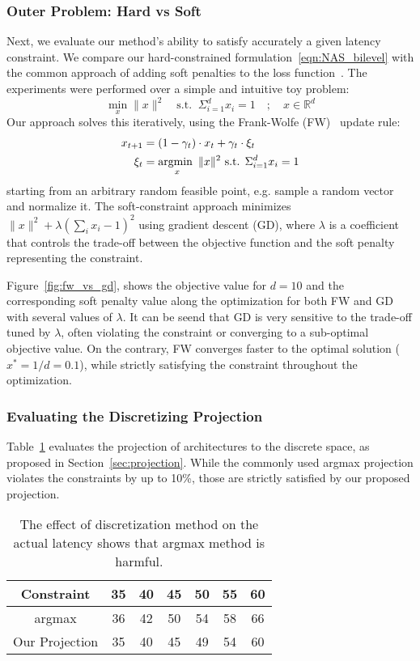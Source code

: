 \documentclass[dvipsnames,table,xcdraw]{article}
\newcommand{\argmin}{\operatornamewithlimits{argmin~}}
\begin{document}
\subsubsection{Outer Problem: Hard vs Soft }\label{subsec:toy_example}
Next, we evaluate our method's ability to satisfy accurately a given latency constraint.
We compare our hard-constrained formulation~\eqref{eqn:NAS_bilevel} with the common approach of adding soft penalties to the loss function~\cite{TF-NAS, fbnet}.
The experiments were performed over a simple and intuitive toy problem:
\begin{equation}
    \label{eqn:toy_ex}
    \min_x \|x\|^2  \quad \text{s.t. }\ 
       \Sigma_{i=1}^d x_i = 1 \quad ; \quad x\in\mathbb{R}^d
\end{equation}
Our approach solves this iteratively, using the Frank-Wolfe (FW)~\cite{frank_wolfe} update rule:
\begin{align}\label{eqn:toy_fw_step}
x_{t+1} &= (1-\gamma_t)\cdot x_t + \gamma_t\cdot\xi_t\\
\xi_t &=\argmin_x \|x\|^2 \text{ s.t. } \Sigma_{i=1}^d x_i = 1
\end{align}
starting from an arbitrary random feasible point, e.g. sample a random vector and normalize it.
The soft-constraint approach minimizes $\|x\|^2+\lambda \left(\sum_i x_i - 1\right)^2$ using gradient descent (GD), where $\lambda$ is a coefficient that controls the trade-off between the objective function and the soft penalty representing the constraint.

Figure~\ref{fig:fw_vs_gd}, shows the objective value for $d=10$ and the corresponding soft penalty value along the optimization for both FW and GD with several values of $\lambda$.
It can be seend that GD is very sensitive to the trade-off tuned by $\lambda$, often violating the constraint or converging to a sub-optimal objective value. On the contrary, FW converges faster to the optimal solution ($x^*=1/d=0.1$), while strictly satisfying the constraint throughout the optimization.

\subsubsection{Evaluating the Discretizing Projection}\label{sec:projection_effect}
Table~\ref{tbl:projection} evaluates the projection of architectures to the discrete space, as proposed in Section~\ref{sec:projection}. While the commonly used argmax projection violates the constraints by up to 10\%, those are strictly satisfied by our proposed projection.
\vspace{1em}
\begin{table}[htb]
    \centering
    \begin{tabular}{c|c|c|c|c|c|c|}
    Constraint & 35 & 40 & 45 & 50 & 55 & 60 \\ \midrule
    argmax & 36 & 42 & 50 & 54 & 58 & 66 \\ 
    Our Projection & 35 & 40 & 45 & 49 & 54 & 60 \\
    \end{tabular}
    \caption{The effect of discretization method on the actual latency shows that argmax method is harmful.}
    \label{tbl:projection}
\end{table}
\end{document}
